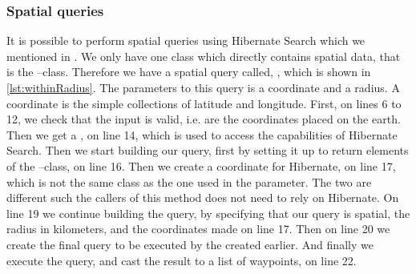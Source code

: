 \subsubsection*{Spatial queries}\label{subsubsec:spatial}
It is possible to perform spatial queries using Hibernate Search which we mentioned in .
We only have one class which directly contains spatial data, that is the --class.
Therefore we have a spatial query called, , which is shown in \cref{lst:withinRadius}.
The parameters to this query is a coordinate and a radius.
A coordinate is the simple collections of latitude and longitude.
First, on lines 6 to 12, we check that the input is valid, i.e. are the coordinates placed on the earth.
Then we get a , on line 14, which is used to access the capabilities of Hibernate Search.
Then we start building our query, first by setting it up to return elements of the --class, on line 16.
Then we create a coordinate for Hibernate, on line 17, which is not the same class as the one used in the parameter.
The two are different such the callers of this method does not need to rely on Hibernate.
On line 19 we continue building the query, by specifying that our query is spatial, the radius in kilometers, and the coordinates made on line 17.
Then on line 20 we create the final query to be executed by the  created earlier.
And finally we execute the query, and cast the result to a list of waypoints, on line 22.
